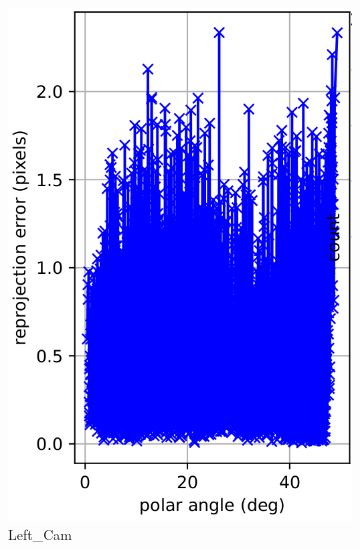 \documentclass{article}
\begin{document}
\begin{figure}
     \centering
     \begin{subfigure}[b]{0.3\textwidth}
         \centering
         \includegraphics[width=\textwidth]{cam0polar.png}
         \caption{Left\_Cam}
     \end{subfigure}
     \hfill
     \begin{subfigure}[b]{0.3\textwidth}
         \centering

\end{subfigure}
\end{figure}
\end{document}
